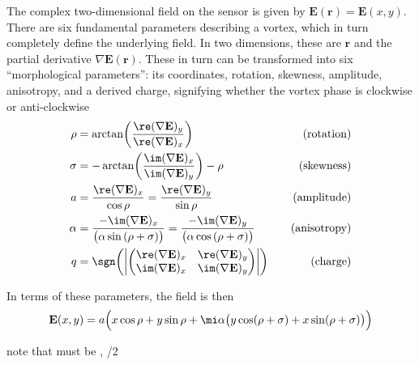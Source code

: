 The complex two-dimensional field on the sensor is given by
$\mathbf{E}(\mathbf{r}) = \mathbf{E}(x,y)$.
There are six fundamental parameters describing a vortex, which in turn
completely define the underlying field.  In two dimensions, these are
$\mathbf{r}$ and the partial derivative $\nabla \mathbf{E}(\mathbf{r})$.
These in turn can be transformed into six ``morphological parameters'': its
coordinates, rotation, skewness, amplitude, anisotropy, and a derived
charge, signifying whether the vortex phase is clockwise or anti-clockwise
\begingroup
\newcommand{\rx}{\re(\nabla \mathbf{E})_x}
\newcommand{\ry}{\re(\nabla \mathbf{E})_y}
\newcommand{\ix}{\im(\nabla \mathbf{E})_x}
\newcommand{\iy}{\im(\nabla \mathbf{E})_y}
\begin{align}
\rho   &= \arctan\!\left(\frac{\ry}{\rx}\right) \quad & \text{(rotation)}\\
\sigma &= -\arctan\!\left(\frac{\ix}{\iy}\right)-\rho \quad & \text{(skewness)}\\
a      &= \frac{\rx}{\cos\rho} = \frac{\ry}{\sin\rho} \quad & \text{(amplitude)}\\
\alpha &= \frac{-\ix}{\bigl(\alpha \sin\left(\rho+\sigma\right)\bigr)}
        = \frac{-\iy}{\bigl(\alpha \cos\left(\rho+\sigma\right)\bigr)} \quad & \text{(anisotropy)} \\
q      &= \sgn\!\left( \left|
          \begin{pmatrix}
          \rx & \ry \\
          \ix & \iy
          \end{pmatrix}
          \right|\right) \quad & \text{(charge)}
\end{align}
\endgroup

In terms of these parameters, the field is then
\begin{equation}
\mathbf{E}(x,y) = a \Bigl( x \cos\rho + y \sin \rho
+ \mi \alpha \bigr(y \cos(\rho + \sigma) + x \sin(\rho+\sigma)\bigr)\Bigr)
\end{equation}

note that \rho must be \pm \pi, \sigma \pm \pi/2


